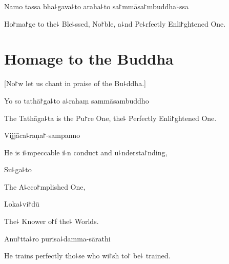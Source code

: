 \vspace{\baselineskip}

Namo tassa bha꜕gava꜕to araha꜕to sa꜓mmāsa꜓mbuddha꜕ssa


\begin{english}
  Ho꜓ma꜓ge to the꜕ Ble꜕ssed, No꜓ble, a꜕nd Pe꜕rfectly Enli꜓ghtened One.

\end{english}

\clearpage

\chapter{Homage to the Buddha}                %

\begin{leader}
\end{leader}

\begin{english}
  [No꜓w let us chant in praise of the Bu꜕ddha.]
\end{english}

Yo so tathā꜓ga꜕to a꜕rahaṃ sammāsambuddho

\begin{english}
  The Tathāga꜕ta is the Pu꜓re One, the꜕ Perfectly Enli꜓ghtened One.
\end{english}

Vijjāca꜕raṇa꜓-sampanno

\begin{english}
  He is i꜕mpeccable i꜕n conduct and u꜕ndersta꜓nding,
\end{english}

Su꜕ga꜕to

\begin{english}
  The A꜕cco꜓mplished One,
\end{english}

Loka꜕vi꜓dū

\begin{english}
  The꜕ Knower o꜓f the꜕ Worlds.
\end{english}

Anu꜓tta꜕ro purisa꜕damma-sārathi

\begin{english}
  He trains perfectly tho꜕se who wi꜓sh to꜓ be꜕ trained.
\end{english}

